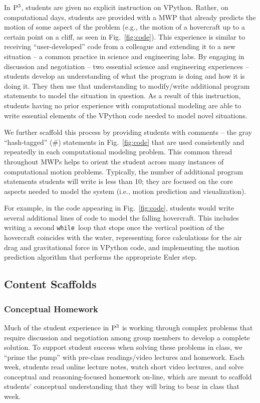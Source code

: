 \documentclass{msuphddissertation}
\begin{document}
\begin{doublespace}
In ${\rm P}^{3}$, students are given no explicit instruction on VPython.  Rather, on computational days, students are provided with a MWP that already predicts the motion of some aspect of the problem (e.g., the motion of a hovercraft up to a certain point on a cliff, as seen in Fig.~\ref{fig:code}).  This experience is similar to receiving ``user-developed'' code from a colleague and extending it to a new situation -- a common practice in science and engineering labs.  By engaging in discussion and negotiation -- two essential science and engineering experiences -- students develop an understanding of what the program is doing and how it is doing it.  They then use that understanding to modify/write additional program statements to model the situation in question.  As a result of this instruction, students having no prior experience with computational modeling are able to write essential elements of the VPython code needed to model novel situations.

We further scaffold this process by providing students with comments -- the gray ``hash-tagged'' (\#) statements in Fig.~\ref{fig:code} that are used consistently and repeatedly in each computational modeling problem.  This common thread throughout MWPs helps to orient the student across many instances of computational motion problems.  Typically, the number of additional program statements students will write is less than 10; they are focused on the core aspects needed to model the system (i.e., motion prediction and visualization).

For example, in the code appearing in Fig.~\ref{fig:code}, students would write several additional lines of code to model the falling hovercraft.  This includes writing a second {\tt while}~loop that stops once the vertical position of the hovercraft coincides with the water, representing force calculations for the air drag and gravitational force in VPython code, and implementing the motion prediction algorithm that performs the appropriate Euler step.

\subsection{Content Scaffolds}

\subsubsection{Conceptual Homework}

Much of the student experience in ${\rm P}^{3}$ is working through complex problems that require discussion and negotiation among group members to develop a complete solution.  To support student success when solving these problems in class, we ``prime the pump'' with pre-class readings/video lectures and homework.  Each week, students read online lecture notes, watch short video lectures, and solve conceptual and reasoning-focused homework on-line, which are meant to scaffold students' conceptual understanding that they will bring to bear in class that week.


\end{doublespace}
\end{document}
